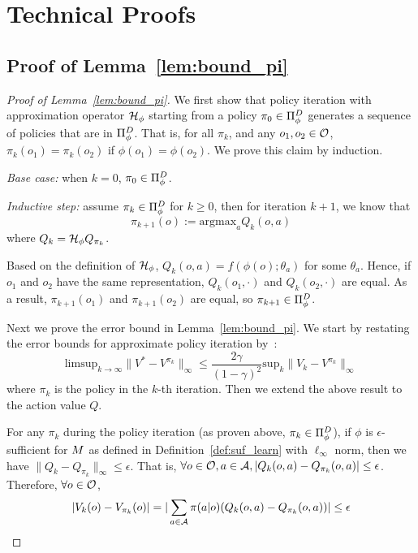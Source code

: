 
\section{Technical Proofs}
\label{app:proofs}

\subsection{Proof of Lemma~\ref{lem:bound_pi}}
\label{proof:bound_pi}

\begin{proof}[Proof of Lemma~\ref{lem:bound_pi}]

We first show that policy iteration with approximation operator $\mathcal{H}_{\phi}$ starting from a policy $\pi_0\in\Pi_{\phi}^D$ generates a sequence of policies that are in $\Pi_{\phi}^D$. That is, for all $\pi_k$, and any $o_1,o_2\in\mathcal{O}$, $\pi_k(o_1)=\pi_k(o_2)$ if $\phi(o_1)=\phi(o_2)$.
We prove this claim by induction.

\textit{Base case:} when $k=0$, $\pi_0\in\Pi_{\phi}^D$.

\textit{Inductive step:} assume $\pi_k \in \Pi_{\phi}^D$ for $k\geq 0$, then for iteration $k+1$, we know that
\begin{equation}
    \pi_{k+1} (o) := \mathrm{argmax}_a Q_k(o,a)
\end{equation}
where $Q_k = \mathcal{H}_{\phi} Q_{\pi_k}$. 

Based on the definition of $\mathcal{H}_{\phi}$, $Q_k(o,a)=f(\phi(o);\theta_a)$ for some $\theta_a$. Hence, if $o_1$ and $o_2$ have the same representation, $Q_k(o_1,\cdot)$ and $Q_k(o_2,\cdot)$ are equal. As a result, $\pi_{k+1}(o_1)$ and $\pi_{k+1}(o_2)$ are equal, so $\pi_{k+1}\in\Pi_{\phi}^D$.

Next we prove the error bound in Lemma~\ref{lem:bound_pi}.
We start by restating the error bounds for approximate policy iteration by~\citet{BertsekasTsitsiklis96}: 
\begin{equation}
    \mathrm{limsup}_{k\to\infty} \|V^*-V^{\pi_k} \|_\infty \leq 
    \frac{2\gamma}{(1-\gamma)^2} \mathrm{sup}_k \| V_k - V^{\pi_k} \|_\infty
\end{equation}
where $\pi_k$ is the policy in the $k$-th iteration.
Then we extend the above result to the action value $Q$.

For any $\pi_k$ during the policy iteration (as proven above, $\pi_k\in\Pi_{\phi}^D$), if $\phi$ is $\epsilon$-sufficient for $M$ as defined in Definition~\ref{def:suf_learn} with $\ell_\infty$ norm, then we have $\| Q_k - Q_{\pi_k} \|_\infty \leq \epsilon$. That is, $\forall o\in\mathcal{O}, a\in\mathcal{A}, | Q_k(o,a) - Q_{\pi_k}(o,a) | \leq \epsilon $. Therefore, $\forall o\in\mathcal{O}$,
\begin{equation}
    |V_k(o) - V_{\pi_k}(o)| = | \sum_{a\in\mathcal{A}} \pi(a|o) (Q_k(o,a) - Q_{\pi_k}(o,a)) | \leq \epsilon \label{eq:vk_bound}
\end{equation}


\end{proof}
